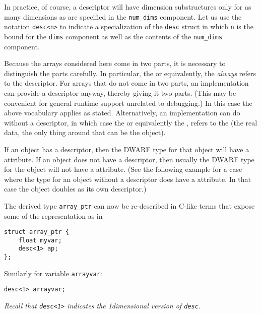 In practice, of course, a  descriptor will have
dimension substructures only for as many dimensions as are
specified in the \texttt{num\_dims} component. Let us use the notation
\texttt{desc\textless n\textgreater}   
to indicate a specialization of the \texttt{desc} struct in
which \texttt{n} is the bound for the \texttt{dims} component as well as the
contents of the \texttt{num\_dims} component.

Because the arrays considered here come in two parts, it is
necessary to distinguish the parts carefully. In particular,
the  or equivalently, the  \emph{always} refers to the descriptor. For
arrays that do not come in two parts, an implementation can
provide a descriptor anyway, thereby giving it two parts. (This
may be convenient for general runtime support unrelated to
debugging.) In this case the above vocabulary applies as
stated. Alternatively, an implementation can do without a
descriptor, in which case the 
or equivalently the , refers
to the  (the real data, the only thing around
that can be the object).

If an object has a descriptor, then the DWARF type for that
object will have a 
\DWATdatalocation{} 
attribute. If an object
does not have a descriptor, then usually the DWARF type for the
object will not have a 
\DWATdatalocation{} attribute. 
(See the following
 example for a case where the type for an object without
a descriptor does have a 
\DWATdatalocation{} attribute. In
that case the object doubles as its own descriptor.)

The  derived type \texttt{array\_ptr} can now be re-described
in C-like terms that expose some of the representation as in

\begin{lstlisting}[numbers=none]
struct array_ptr {
    float myvar;
    desc<1> ap;
};
\end{lstlisting}

Similarly for variable \texttt{arrayvar}:
\begin{lstlisting}[numbers=none]
desc<1> arrayvar;
\end{lstlisting}

\textit{
\bb
Recall that \texttt{desc\textless 1\textgreater} 
indicates the 1\dash dimensional version of \texttt{desc}.
\eb
}

